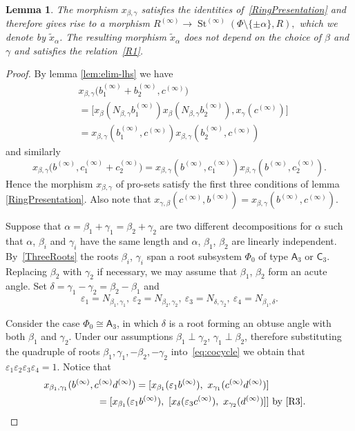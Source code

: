 \documentclass{article}
\numberwithin{equation}{section}
\newtheorem{lemma}{Lemma} \numberwithin{lemma}{section}
\theoremstyle{definition}
\theoremstyle{remark}
\DeclareMathOperator\St{St}
\newcommand{\rA}{\mathsf{A}}
\newcommand{\rC}{\mathsf{C}}
\begin{document}
\begin{lemma}\label{lem:new-root}
 The morphism $x_{\beta, \gamma}$ satisfies the identities of~\cref{RingPresentation} and therefore gives rise to a morphism
 $R^{(\infty)} \to \St^{(\infty)}(\Phi\setminus\{\pm\alpha\}, R),$ which we denote by $\widetilde{x}_\alpha$. The resulting morphism $\widetilde{x}_\alpha$ does not depend on the choice of $\beta$ and $\gamma$ and satisfies the relation~\eqref{R1}.
\end{lemma}
\begin{proof}
 By lemma \ref{lem:elim-lhs} we have
 \begin{align*}
 &x_{\beta, \gamma}\bigl(b_1^{(\infty)} + b_2^{(\infty)}, c^{(\infty)}\bigr)\\
 &= \bigl[x_\beta(N_{\beta, \gamma} b_1^{(\infty)})
 x_\beta(N_{\beta, \gamma} b_2^{(\infty)}),
 x_\gamma(c^{(\infty)})\bigr]\\
 &= x_{\beta, \gamma}(b_1^{(\infty)}, c^{(\infty)})
 x_{\beta, \gamma}(b_2^{(\infty)}, c^{(\infty)})
 \end{align*}
 and similarly
 \[x_{\beta, \gamma}\bigl(b^{(\infty)}, c_1^{(\infty)} + c_2^{(\infty)}\bigr)
 = x_{\beta, \gamma}(b^{(\infty)}, c_1^{(\infty)})
 x_{\beta, \gamma}(b^{(\infty)}, c_2^{(\infty)}).\]
 Hence the morphism \(x_{\beta, \gamma}\) of pro-sets satisfy the first three conditions of lemma \ref{RingPresentation}. Also note that \(x_{\gamma, \beta}(c^{(\infty)}, b^{(\infty)}) = x_{\beta, \gamma}(b^{(\infty)}, c^{(\infty)})\).

 Suppose that \(\alpha = \beta_1 + \gamma_1 = \beta_2 + \gamma_2\) are two different decompositions for $\alpha$ such that $\alpha$, $\beta_i$ and $\gamma_i$ have the same length and \(\alpha\), \(\beta_1\), \(\beta_2\) are linearly independent.
 By~\cref{ThreeRoots} the roots $\beta_i$, $\gamma_i$ span a root subsystem $\Phi_0$ of type \(\rA_3\) or \(\rC_3\). 
 Replacing $\beta_2$ with $\gamma_2$ if necessary, we may assume that \(\beta_1\), \(\beta_2\) form an acute angle.
 Set $\delta = \gamma_1 - \gamma_2 = \beta_2 - \beta_1$ and
 \[\varepsilon_1 = N_{\beta_1, \gamma_1},\ \varepsilon_2 = N_{\beta_2, \gamma_2},\ \varepsilon_3 = N_{\delta,\gamma_2},\ \varepsilon_4 = N_{\beta_1, \delta}.\] 
 
 Consider the case \(\Phi_0 \cong \rA_3\), in which $\delta$ is a root forming an obtuse angle with both $\beta_1$ and $\gamma_2$. 
 Under our assumptions $\beta_1\perp \gamma_2$, $\gamma_1 \perp \beta_2$, therefore 
 substituting the quadruple of roots $\beta_1, \gamma_1, -\beta_2, -\gamma_2$ into~\eqref{eq:cocycle} we obtain that
 $\varepsilon_1 \varepsilon_2 \varepsilon_3 \varepsilon_4 = 1$.
 Notice that
 \begin{align}
 x_{\beta_1, \gamma_1}(b^{(\infty)}, c^{(\infty)} d^{(\infty)}) = [x_{\beta_1}(\varepsilon_1b^{(\infty)}),\ x_{\gamma_1}(c^{(\infty)}d^{(\infty)})] \label{eq:a3-start} \\ 
 = [x_{\beta_1}(\varepsilon_1b^{(\infty)}),\ [x_\delta(\varepsilon_3 c^{(\infty)}),\ x_{\gamma_2}(d^{(\infty)})]] & \text{ by~\eqref{R3}.} \nonumber
 \end{align}
 

\end{proof}
\end{document}
